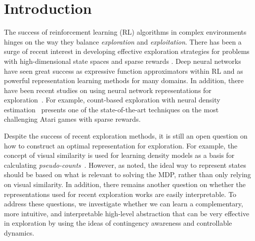 \documentclass{article} \usepackage{iclr,times}
\begin{document}
\section{Introduction}
\label{sec:introduction}
\vspace*{-0.15cm}




The success of reinforcement learning (RL) algorithms in complex environments hinges on the way
they balance {\em exploration} and {\em exploitation}.
There has been a surge of recent interest in developing effective exploration strategies for problems
with high-dimensional state spaces and sparse rewards \citep{Schmidhuber:1991,Oudeyer:2009,Houthooft:NIPS2016:VIME,Bellemare:NIPS2016:UnifyingCount,Osband:NIPS2016:BootstrappedDQN,Pathak:ICML2017:Curiosity,Plappert:ICLR2018:ParamExp,Zheng:NIPS2018:LIRPG}.
Deep neural networks have seen great success as expressive function approximators within RL and as
powerful representation learning methods for many domains. 
In addition, there have been recent studies on using neural network representations for exploration~\citep{Tang:NIPS2017:SimHash,Martin:1706.08090,Pathak:ICML2017:Curiosity}.
For example, count-based exploration with neural density estimation~\citep{Bellemare:NIPS2016:UnifyingCount,Tang:NIPS2017:SimHash,Ostrovski:ICML2017:ExplorationDensity} presents one of the state-of-the-art techniques on the most challenging Atari games with sparse rewards. 

Despite the success of recent exploration methods, it is still an open question on how to construct an optimal representation for exploration. 
For example, the concept of visual similarity is used for learning density models as a basis for calculating \emph{pseudo-counts}~\citep{Bellemare:NIPS2016:UnifyingCount,Ostrovski:ICML2017:ExplorationDensity}. 
However, as \cite{Tang:NIPS2017:SimHash} noted, 
the ideal way to represent states should be based on what is relevant to solving the MDP, rather than only relying on visual similarity.
In addition, there remains another question on whether the representations used for recent exploration works are easily interpretable. To address these questions, we investigate whether we can learn a complementary, more intuitive, and interpretable
high-level abstraction that can be very effective in exploration
by using the ideas of contingency awareness and controllable dynamics.
\end{document}
